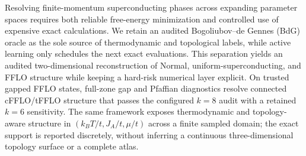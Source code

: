 Resolving finite-momentum superconducting phases across expanding parameter spaces requires both reliable free-energy minimization and controlled use of expensive exact calculations. We retain an audited Bogoliubov--de Gennes (BdG) oracle as the sole source of thermodynamic and topological labels, while active learning only schedules the next exact evaluations. This separation yields an audited two-dimensional reconstruction of Normal, uniform-superconducting, and FFLO structure while keeping a hard-risk numerical layer explicit. On trusted gapped FFLO states, full-zone gap and Pfaffian diagnostics resolve connected cFFLO/tFFLO structure that passes the configured $k=8$ audit with a retained $k=6$ sensitivity. The same framework exposes thermodynamic and topology-aware structure in $(k_BT/t,J_A/t,\mu/t)$ across a finite sampled domain; the exact support is reported discretely, without inferring a continuous three-dimensional topology surface or a complete atlas.
